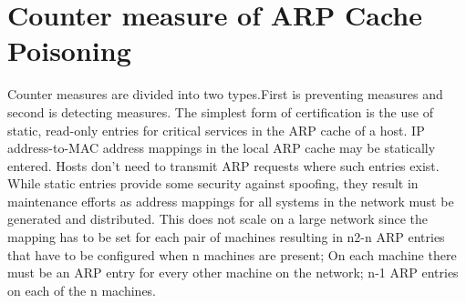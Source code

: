 \documentclass{article}
\begin{document}
\section{Counter measure of ARP Cache Poisoning}
Counter measures are divided into two types.First is preventing measures and second is detecting measures.
The simplest form of certification is the use of static, read-only entries for critical services in the ARP cache of a host. IP address-to-MAC address mappings in the local ARP cache may be statically entered. Hosts don't need to transmit ARP requests where such entries exist. While static entries provide some security against spoofing, they result in maintenance efforts as address mappings for all systems in the network must be generated and distributed. This does not scale on a large network since the mapping has to be set for each pair of machines resulting in n2-n ARP entries that have to be configured when n machines are present; On each machine there must be an ARP entry for every other machine on the network; n-1 ARP entries on each of the n machines.
\end{document}
